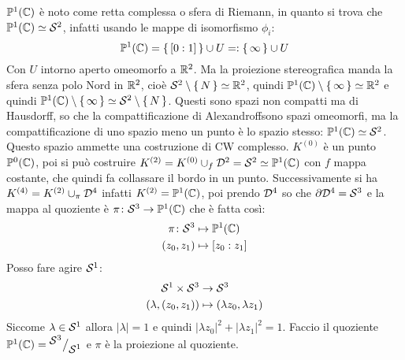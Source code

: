 \begin{example}[$ n = 1 $]
  $ \mathbb{P}^{1} (\mathbb{C}) $ è noto come retta complessa o sfera di Riemann, in quanto
  si trova che $ \mathbb{P}^{1} (\mathbb{C}) \simeq \mathcal{S}^{2} $, infatti usando le mappe di isomorfismo $ \phi_i $:
  \[
    \mathbb{P}^{1} (\mathbb{C}) = \set{ [0:1] } \cup U =: \set{\infty} \cup U
  \]
  Con $ U $ intorno aperto omeomorfo a $ \mathbb{R}^{2} $. Ma la proiezione
  stereografica manda la sfera senza polo Nord in $ \mathbb{R}^{2} $, cioè
  $ \mathcal{S}^{2} \setminus \set{N} \simeq \mathbb{R}^{2} $, quindi
  $ \mathbb{P}^{1} (\mathbb{C}) \setminus \set{\infty} \simeq \mathbb{R}^{2} $ e quindi
  $ \mathbb{P}^{1} (\mathbb{C}) \setminus \set{\infty} \simeq \mathcal{S}^{2} \setminus \set{N} $. Questi sono spazi non compatti ma
  di Hausdorff, so che la compattificazione di Alexandroff\footnotemark sono
  spazi omeomorfi, ma la compattificazione di uno spazio meno un punto è lo
  spazio stesso: $ \mathbb{P}^{1} (\mathbb{C}) \simeq \mathcal{S}^{2} $. Questo spazio ammette una costruzione di
  CW complesso. $ K^{(0)} $ è un punto $ \mathbb{P}^{0} (\mathbb{C}) $, poi si può costruire
  $ K^{(2)} = K^{(0)} \cup_f \mathcal{D}^{2} = \mathcal{S}^{2} \simeq \mathbb{P}^{1} (\mathbb{C}) $ con $ f $ mappa
  costante, che quindi fa collassare il bordo in un punto. Successivamente si ha
  $ K^{(4)} = K^{(2)} \cup_\pi \mathcal{D}^{4} $ infatti $ K^{(2)} = \mathbb{P}^{1} (\mathbb{C}) $, poi prendo
  $ \mathcal{D}^{4} $ so che $ \partial \mathcal{D}^{4} = \mathcal{S}^{3} $ e la mappa al quoziente è
  $ \pi \colon \mathcal{S}^{3} \to \mathbb{P}^{1} (\mathbb{C}) $ che è fatta così:
  \begin{align*}
    \pi \colon \mathcal{S}^{3} & \mapsto \mathbb{P}^{1} (\mathbb{C}) \\
    (z_0, z_1) & \mapsto [z_0 : z_1]
  \end{align*}
  Posso fare agire $ \mathcal{S}^{1} $:
  \begin{align*}
    \mathcal{S}^{1} \times \mathcal{S}^{3} & \to \mathcal{S}^{3} \\
    (\lambda, (z_0, z_1)) & \mapsto (\lambda z_0, \lambda z_1)
  \end{align*}
  Siccome $ \lambda \in \mathcal{S}^{1} $ allora $ | \lambda | = 1 $ e quindi $ | \lambda z_0 |^2 + | \lambda z_1 |^2 = 1 $.
  Faccio il quoziente $ \mathbb{P}^{1} (\mathbb{C}) = {^{\textstyle \mathcal{S}^{3}}\big/_{\textstyle \mathcal{S}^{1}}} $ e $ \pi $ è la proiezione al
  quoziente.
\end{example}

